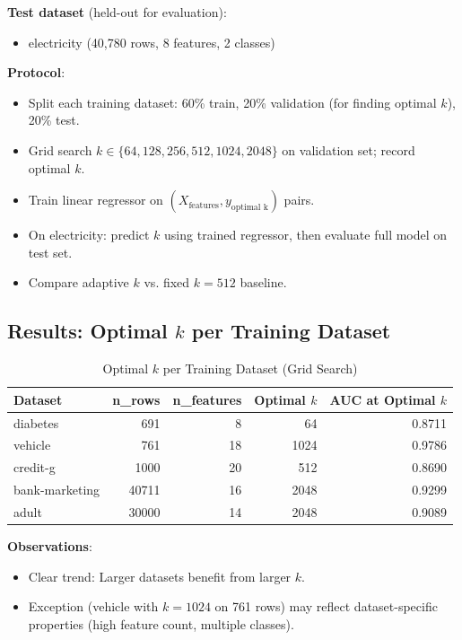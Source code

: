 \documentclass[11pt,a4paper]{article}
\begin{document}
\textbf{Test dataset} (held-out for evaluation):
\begin{itemize}
\item electricity (40,780 rows, 8 features, 2 classes)
\end{itemize}

\textbf{Protocol}:
\begin{itemize}
\item Split each training dataset: 60\% train, 20\% validation (for finding optimal $k$), 20\% test.
\item Grid search $k \in \{64, 128, 256, 512, 1024, 2048\}$ on validation set; record optimal $k$.
\item Train linear regressor on $(X_{\text{features}}, y_{\text{optimal k}})$ pairs.
\item On electricity: predict $k$ using trained regressor, then evaluate full model on test set.
\item Compare adaptive $k$ vs. fixed $k=512$ baseline.
\end{itemize}

\subsection{Results: Optimal $k$ per Training Dataset}

\begin{table}[h]
\centering
\caption{Optimal $k$ per Training Dataset (Grid Search)}
\label{tab:optimal_k}
\begin{tabular}{lrrrr}
\toprule
Dataset & n\_rows & n\_features & Optimal $k$ & AUC at Optimal $k$ \\
\midrule
diabetes & 691 & 8 & 64 & 0.8711 \\
vehicle & 761 & 18 & 1024 & 0.9786 \\
credit-g & 1000 & 20 & 512 & 0.8690 \\
bank-marketing & 40711 & 16 & 2048 & 0.9299 \\
adult & 30000 & 14 & 2048 & 0.9089 \\
\bottomrule
\end{tabular}
\end{table}

\textbf{Observations}:
\begin{itemize}
\item Clear trend: Larger datasets benefit from larger $k$.
\item Exception (vehicle with $k=1024$ on 761 rows) may reflect dataset-specific properties (high feature count, multiple classes).
\end{itemize}
\end{document}

